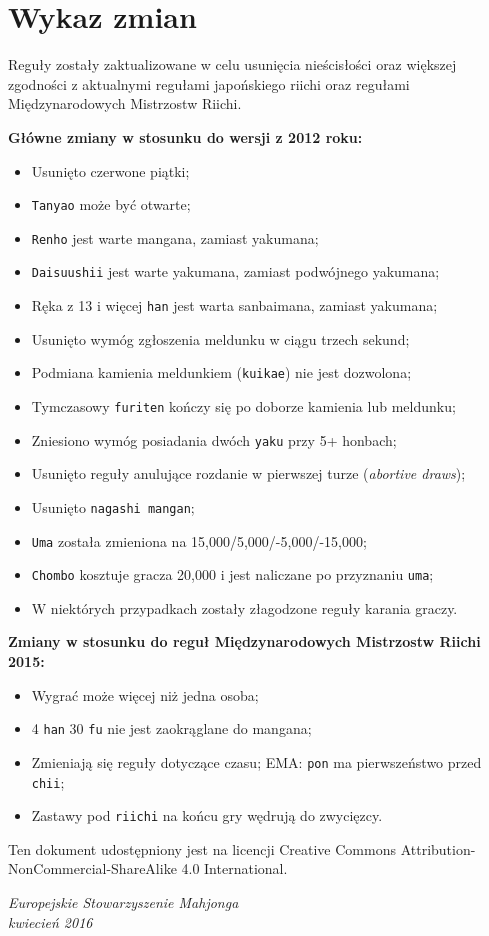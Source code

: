 \section*{Wykaz zmian}

Reguły zostały zaktualizowane w celu usunięcia nieścisłości oraz większej zgodności z aktualnymi regułami japońskiego riichi oraz regułami Międzynarodowych Mistrzostw Riichi.

\textbf{Główne zmiany w stosunku do wersji z 2012 roku:}
\begin{itemize}
    \item Usunięto czerwone piątki;
    \item \texttt{Tanyao} może być otwarte;
    \item \texttt{Renho} jest warte mangana, zamiast yakumana;
    \item \texttt{Daisuushii} jest warte yakumana, zamiast podwójnego yakumana;
    \item Ręka z 13 i więcej \texttt{han} jest warta sanbaimana, zamiast yakumana;
    \item Usunięto wymóg zgłoszenia meldunku w ciągu trzech sekund;
    \item Podmiana kamienia meldunkiem (\texttt{kuikae}) nie jest dozwolona;
    \item Tymczasowy \texttt{furiten} kończy się po doborze kamienia lub meldunku;
    \item Zniesiono wymóg posiadania dwóch \texttt{yaku} przy 5+ honbach;
    \item Usunięto reguły anulujące rozdanie w pierwszej turze (\emph{abortive draws});
    \item Usunięto \texttt{nagashi mangan};
    \item \texttt{Uma} została zmieniona na 15,000/5,000/-5,000/-15,000;
    \item \texttt{Chombo} kosztuje gracza 20,000 i jest naliczane po przyznaniu \texttt{uma};
    \item W niektórych przypadkach zostały złagodzone reguły karania graczy.
\end{itemize}

\textbf{Zmiany w stosunku do reguł Międzynarodowych Mistrzostw Riichi 2015:}
\begin{itemize}
    \item Wygrać może więcej niż jedna osoba;
    \item 4 \texttt{han} 30 \texttt{fu} nie jest zaokrąglane do mangana;
    \item Zmieniają się reguły dotyczące czasu; EMA: \texttt{pon} ma pierwszeństwo przed \texttt{chii};
    \item Zastawy pod \texttt{riichi} na końcu gry wędrują do zwycięzcy.
\end{itemize}

Ten dokument udostępniony jest na licencji Creative Commons Attribution-NonCommercial-ShareAlike 4.0 International.

\begin{flushright}
  \emph{
    Europejskie Stowarzyszenie Mahjonga \\
    kwiecień 2016
  }
\end{flushright}